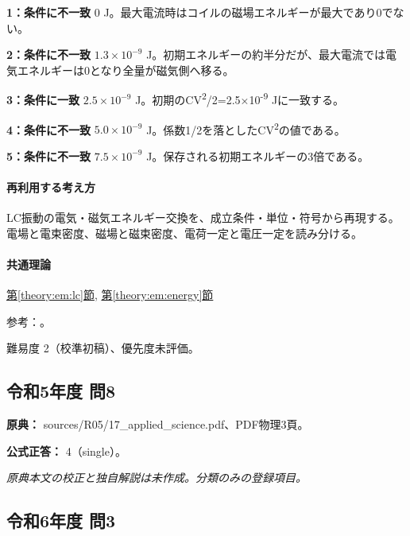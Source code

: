 \noindent\textbf{1：条件に不一致} 0 J。最大電流時はコイルの磁場エネルギーが最大であり0でない。\par

\noindent\textbf{2：条件に不一致} \(1.3\times10^{-9}\) J。初期エネルギーの約半分だが、最大電流では電気エネルギーは0となり全量が磁気側へ移る。\par

\noindent\textbf{3：条件に一致} \(2.5\times10^{-9}\) J。初期のCV\textsuperscript{2}/2=\allowbreak{}2.5×10\textsuperscript{-9} Jに一致する。\par

\noindent\textbf{4：条件に不一致} \(5.0\times10^{-9}\) J。係数1/2を落としたCV\textsuperscript{2}の値である。\par

\noindent\textbf{5：条件に不一致} \(7.5\times10^{-9}\) J。保存される初期エネルギーの3倍である。\par

\paragraph{再利用する考え方} LC振動の電気・磁気エネルギー交換を、成立条件・単位・符号から再現する。電場と電束密度、磁場と磁束密度、電荷一定と電圧一定を読み分ける。

\paragraph{共通理論} \hyperref[theory:em:lc]{第\ref*{theory:em:lc}節}, \hyperref[theory:em:energy]{第\ref*{theory:em:energy}節}

\par 参考：\cite{mit_em11}。

\par 難易度 2（校準初稿）、優先度未評価。

\subsection{令和5年度 問8}
\label{q:r05-reg-applied-08}

\noindent\textbf{原典：} sources/R05/17\_applied\_science.pdf、PDF物理3頁。

\textbf{公式正答：} 4（single）。

\par\textit{原典本文の校正と独自解説は未作成。分類のみの登録項目。}

\subsection{令和6年度 問3}
\label{q:r06-reg-applied-03}


